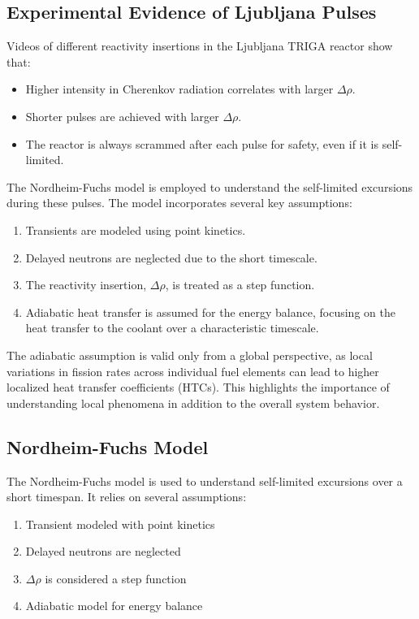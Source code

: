 \subsection{Experimental Evidence of Ljubljana Pulses}
Videos of different reactivity insertions in the Ljubljana TRIGA reactor show that:
\begin{itemize}
    \item Higher intensity in Cherenkov radiation correlates with larger $\Delta \rho$.
    \item Shorter pulses are achieved with larger $\Delta \rho$.
    \item The reactor is always scrammed after each pulse for safety, even if it is self-limited.
\end{itemize}
The Nordheim-Fuchs model is employed to understand the self-limited excursions during these pulses. The model incorporates several key assumptions:
\begin{enumerate}
    \item Transients are modeled using point kinetics.
    \item Delayed neutrons are neglected due to the short timescale.
    \item The reactivity insertion, $\Delta \rho$, is treated as a step function.
    \item Adiabatic heat transfer is assumed for the energy balance, focusing on the heat transfer to the coolant over a characteristic timescale.
\end{enumerate}
The adiabatic assumption is valid only from a global perspective, as local variations in fission rates across individual fuel elements can lead to higher localized heat transfer coefficients (HTCs). This highlights the importance of understanding local phenomena in addition to the overall system behavior.

\subsection{Nordheim-Fuchs Model}
The Nordheim-Fuchs model is used to understand self-limited excursions over a short timespan. It relies on several assumptions:
\begin{enumerate}
    \item Transient modeled with point kinetics
    \item Delayed neutrons are neglected
    \item $\Delta \rho$ is considered a step function
    \item Adiabatic model for energy balance
\end{enumerate}

